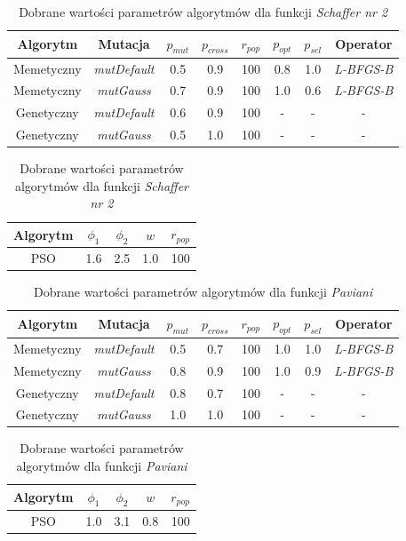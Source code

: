 \begin{table}[ht]
\caption{Dobrane wartości parametrów algorytmów dla funkcji \emph{Schaffer nr 2}}
\label{table:selekcja_Schaffer_parametry}
\begin{center}
\begin{tabular}{|c|c|c|c|c|c|c|c|}
	\hline
	Algorytm & Mutacja & $p_{mut}$ & $p_{cross}$ & $r_{pop}$ & $p_{opt}$ & $p_{sel}$ & Operator\\
	\hline
	Memetyczny & \emph{mutDefault} & 0.5 & 0.9 & 100 & 0.8 & 1.0 & \emph{L-BFGS-B} \\
	Memetyczny & \emph{mutGauss}  & 0.7 & 0.9 & 100 & 1.0 & 0.6 & \emph{L-BFGS-B} \\
	Genetyczny & \emph{mutDefault} & 0.6 & 0.9 & 100 & - & - & - \\
	Genetyczny & \emph{mutGauss}  & 0.5 & 1.0 & 100 & - & - & - \\
	\hline
	\end{tabular}

\begin{tabular}{|c|c|c|c|c|}
	\hline
	Algorytm & $\phi_1$ & $\phi_2$ & $w$ & $r_{pop}$ \\
	\hline
	PSO & 1.6 & 2.5 & 1.0 & 100 \\
	\hline
\end{tabular}
\end{center}
\end{table}
  
\begin{table}[ht]
\caption{Dobrane wartości parametrów algorytmów dla funkcji \emph{Paviani}}
\label{table:selekcja_Paviani_parametry}
\begin{center}
\begin{tabular}{|c|c|c|c|c|c|c|c|}
	\hline
	Algorytm & Mutacja & $p_{mut}$ & $p_{cross}$ & $r_{pop}$ & $p_{opt}$ & $p_{sel}$ & Operator\\
	\hline
	Memetyczny & \emph{mutDefault} & 0.5 & 0.7 & 100 & 1.0 & 1.0 & \emph{L-BFGS-B} \\
	Memetyczny & \emph{mutGauss}  & 0.8 & 0.9 & 100 & 1.0 & 0.9 & \emph{L-BFGS-B} \\
	Genetyczny & \emph{mutDefault} & 0.8 & 0.7 & 100 & - & - & - \\
	Genetyczny & \emph{mutGauss}  & 1.0 & 1.0 & 100 & - & - & - \\
	\hline
	\end{tabular}

\begin{tabular}{|c|c|c|c|c|}
	\hline
	Algorytm & $\phi_1$ & $\phi_2$ & $w$ & $r_{pop}$ \\
	\hline
	PSO & 1.0 & 3.1 & 0.8 & 100 \\
	\hline
\end{tabular}
\end{center}
\end{table}

